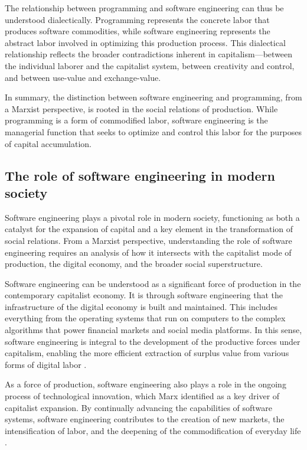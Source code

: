 \begin{refsection}
\begin{multicols}{2}
{The relationship between programming and software engineering can thus be understood dialectically. Programming represents the concrete labor that produces software commodities, while software engineering represents the abstract labor involved in optimizing this production process. This dialectical relationship reflects the broader contradictions inherent in capitalism—between the individual laborer and the capitalist system, between creativity and control, and between use-value and exchange-value.

In summary, the distinction between software engineering and programming, from a Marxist perspective, is rooted in the social relations of production. While programming is a form of commodified labor, software engineering is the managerial function that seeks to optimize and control this labor for the purposes of capital accumulation.
}

\subsection{The role of software engineering in modern society}
{\small
Software engineering plays a pivotal role in modern society, functioning as both a catalyst for the expansion of capital and a key element in the transformation of social relations. From a Marxist perspective, understanding the role of software engineering requires an analysis of how it intersects with the capitalist mode of production, the digital economy, and the broader social superstructure.

Software engineering can be understood as a significant force of production in the contemporary capitalist economy. It is through software engineering that the infrastructure of the digital economy is built and maintained. This includes everything from the operating systems that run on computers to the complex algorithms that power financial markets and social media platforms. In this sense, software engineering is integral to the development of the productive forces under capitalism, enabling the more efficient extraction of surplus value from various forms of digital labor \cite{marx1867capital}.

As a force of production, software engineering also plays a role in the ongoing process of technological innovation, which Marx identified as a key driver of capitalist expansion. By continually advancing the capabilities of software systems, software engineering contributes to the creation of new markets, the intensification of labor, and the deepening of the commodification of everyday life \cite{schiller1999digital}.

}
\end{multicols}
\end{refsection}
